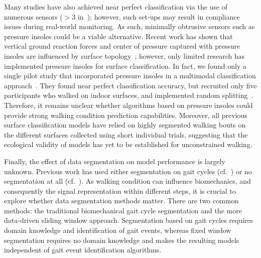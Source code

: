 \documentclass[sensors,article,accept,pdftex,moreauthors]{Definitions/mdpi}
\begin{document}
\textcolor{revision}{Many studies have also achieved near perfect classification via the use of numerous sensors ($>$3 in~\cite{Shah_2022, mcquire2021uneven, ng2022machine, chauhan2025classifying, shin2021locomotion, camargo2021machine, seo2025gait}); however, such set-ups  may result in compliance issues during real-world monitoring.} \textcolor{revision}{As such,} minimally obtrusive sensors such as pressure insoles could be a viable alternative. \textcolor{revision}{Recent work has shown that vertical ground reaction forces and center of pressure captured with pressure insoles are influenced by surface topology~\cite{warmerdam2024walking}; however, only limited research has implemented pressure insoles for surface classification. In fact, we found only a single pilot study that incorporated pressure insoles in a multimodal classification approach~\cite{seo2025gait}. They found near perfect classification accuracy, but recruited only five participants who walked on indoor surfaces, and implemented random splitting~\cite{seo2025gait}. Therefore, it remains unclear whether} algorithms based on pressure insoles could provide strong walking condition prediction capabilities. Moreover, \textcolor{revision}{all} previous surface classification \textcolor{revision}{models} have relied on \textcolor{revision}{highly segmented walking bouts on the different surfaces} collected using short individual \textcolor{revision}{trials}, suggesting that the ecological validity of \textcolor{revision}{models} has yet to be established \textcolor{revision}{for unconstrained walking}.

\textcolor{revision}{Finally}, the effect of data segmentation on model performance is largely unknown. Previous work has used either segmentation on gait cycles ({cf.}~\cite{Shah_2022}) or no segmentation at all ({cf.}~\cite{chauhan2025classifying}). As walking condition can influence biomechanics, and consequently the signal representation within different steps, it is crucial to explore whether data segmentation methods matter. There are two common methods: the traditional biomechanical gait cycle segmentation and the more data-driven sliding window approach. Segmentation based on gait cycles requires domain knowledge and identification of gait events, whereas fixed window segmentation requires no domain knowledge and makes the resulting models independent of gait event identification algorithms. 
\end{document}
